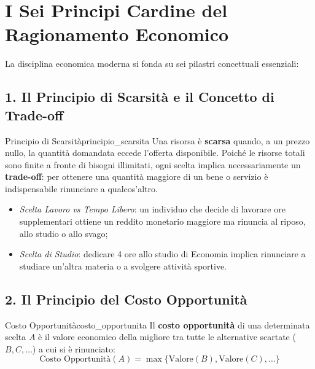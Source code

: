 \section{I Sei Principi Cardine del Ragionamento Economico}

La disciplina economica moderna si fonda su sei pilastri concettuali essenziali:

\subsection{1. Il Principio di Scarsità e il Concetto di Trade-off}

\begin{legge}{Principio di Scarsità}{principio_scarsita}
Una risorsa è \textbf{scarsa} quando, a un prezzo nullo, la quantità domandata eccede l'offerta disponibile. Poiché le risorse totali sono finite a fronte di bisogni illimitati, ogni scelta implica necessariamente un \textbf{trade-off}: per ottenere una quantità maggiore di un bene o servizio è indispensabile rinunciare a qualcos'altro.
\end{legge}

\begin{esempio}
\begin{itemize}
    \item \textit{Scelta Lavoro vs Tempo Libero}: un individuo che decide di lavorare ore supplementari ottiene un reddito monetario maggiore ma rinuncia al riposo, allo studio o allo svago;
    \item \textit{Scelta di Studio}: dedicare 4 ore allo studio di Economia implica rinunciare a studiare un'altra materia o a svolgere attività sportive.
\end{itemize}
\end{esempio}

\subsection{2. Il Principio del Costo Opportunità}

\begin{definizione}{Costo Opportunità}{costo_opportunita}
Il \textbf{costo opportunità} di una determinata scelta $A$ è il valore economico della migliore tra tutte le alternative scartate ($B, C, \dots$) a cui si è rinunciato:
\begin{equation}
    \text{Costo Opportunità}(A) = \max \{ \text{Valore}(B), \text{Valore}(C), \dots \}
\end{equation}
\end{definizione}

